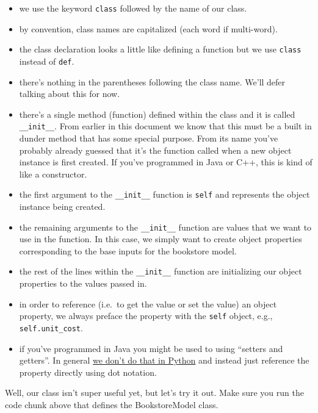 \documentclass[11pt]{article}
\providecommand{\tightlist}{%
      \setlength{\itemsep}{0pt}\setlength{\parskip}{0pt}}
\begin{document}
\begin{itemize}
\tightlist
\item
  we use the keyword \texttt{class} followed by the name of our class.
\item
  by convention, class names are capitalized (each word if multi-word).
\item
  the class declaration looks a little like defining a function but we
  use \texttt{class} instead of \texttt{def}.
\item
  there's nothing in the parentheses following the class name. We'll
  defer talking about this for now.
\item
  there's a single method (function) defined within the class and it is
  called \texttt{\_\_init\_\_}. From earlier in this document we know
  that this must be a built in dunder method that has some special
  purpose. From its name you've probably already guessed that it's the
  function called when a new object instance is first created. If you've
  programmed in Java or C++, this is kind of like a constructor.
\item
  the first argument to the \texttt{\_\_init\_\_} function is
  \texttt{self} and represents the object instance being created.
\item
  the remaining arguments to the \texttt{\_\_init\_\_} function are
  values that we want to use in the function. In this case, we simply
  want to create object properties corresponding to the base inputs for
  the bookstore model.
\item
  the rest of the lines within the \texttt{\_\_init\_\_} function are
  initializing our object properties to the values passed in.
\item
  in order to reference (i.e.~to get the value or set the value) an
  object property, we always preface the property with the \texttt{self}
  object, e.g., \texttt{self.unit\_cost}.
\item
  if you've programmed in Java you might be used to using ``setters and
  getters''. In general
  \href{https://www.python-course.eu/python3_properties.php}{we don't do
  that in Python} and instead just reference the property directly using
  dot notation.
\end{itemize}

    Well, our class isn't super useful yet, but let's try it out. Make sure
you run the code chunk above that defines the BookstoreModel class.
\end{document}
